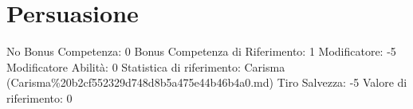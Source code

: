 \section{Persuasione}\label{persuasione}

\begin{description}
\tightlist
\item[Tags: ABI]
No Bonus Competenza: 0 Bonus Competenza di Riferimento: 1 Modificatore:
-5 Modificatore Abilità: 0 Statistica di riferimento: Carisma
(Carisma\%20b2cf552329d748d8b5a475e44b46b4a0.md) Tiro Salvezza: -5
Valore di riferimento: 0
\end{description}
